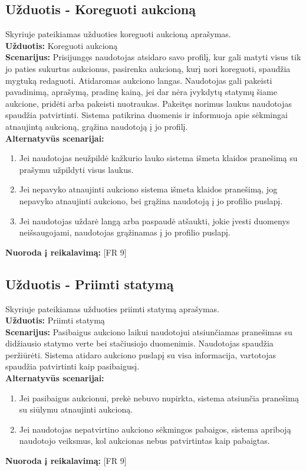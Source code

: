 \documentclass{VUMIFPSkursinis}
\begin{document}
	\subsection{Užduotis - Koreguoti aukcioną}
	Skyriuje pateikiamas užduoties koreguoti aukcioną aprašymas.\\
	\textbf{Užduotis:}  Koreguoti aukcioną \\
	\textbf{Scenarijus:}  Prisijungęs naudotojas atsidaro savo profilį, kur gali matyti visus tik jo paties sukurtus aukcionus, pasirenka aukcioną, kurį nori koreguoti, spaudžia mygtuką redaguoti. Atidaromas aukciono langas. Naudotojas gali pakeisti pavadinimą, aprašymą, pradinę kainą, jei dar nėra įvykdytų statymų šiame aukcione, pridėti arba pakeisti nuotraukas. Pakeitęs norimus laukus naudotojas spaudžia patvirtinti. Sistema patikrina duomenis ir informuoja apie sėkmingai atnaujintą aukcioną, grąžina naudotoją į jo profilį.  \\
	\textbf{Alternatyvūs scenarijai:}
	\begin{enumerate}
		\item Jei naudotojas neužpildė kažkurio lauko sistema išmeta klaidos pranešimą su prašymu užpildyti visus laukus. 
		\item Jei nepavyko atnaujinti aukciono sistema išmeta klaidos pranešimą, jog nepavyko atnaujinti aukciono, bei grąžina naudotoją į jo profilio puslapį. 
		\item Jei naudotojas uždarė langą arba paspaudė atšaukti, jokie įvesti duomenys neišsaugojami, naudotojas grąžinamas į jo profilio puslapį. 
	\end{enumerate}
	\textbf{Nuoroda į reikalavimą: } [FR 9]
	
	\subsection{Užduotis - Priimti statymą}
	Skyriuje pateikiamas užduoties priimti statymą aprašymas.\\
	\textbf{Užduotis:}  Priimti statymą \\
	\textbf{Scenarijus:}  Pasibaigus aukciono laikui naudotojui atsiunčiamas pranešimas su didžiausio statymo verte bei stačiusiojo duomenimis. Naudotojas spaudžia peržiūrėti. Sistema atidaro aukciono puslapį su visa informacija, vartotojas spaudžia patvirtinti kaip pasibaigusį.  \\
	\textbf{Alternatyvūs scenarijai:}
	\begin{enumerate}
		\item Jei pasibaigus aukcionui, prekė nebuvo nupirkta, sistema atsiunčia pranešimą su siūlymu atnaujinti aukcioną. 
		\item Jei naudotojas nepatvirtino aukciono sėkmingos pabaigos, sistema apriboją naudotojo veiksmus, kol aukcionas nebus patvirtintas kaip pabaigtas. 
	\end{enumerate}
	\textbf{Nuoroda į reikalavimą: } [FR 9]
	
\end{document}
